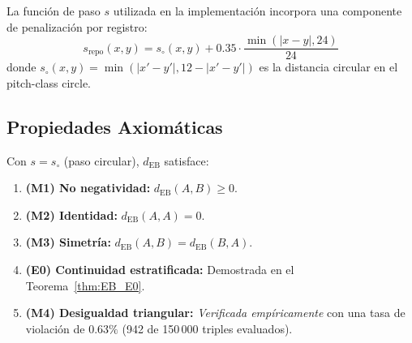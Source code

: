 La función de paso $s$ utilizada en la implementación incorpora una componente de penalización por registro:
\begin{equation}
s_{\text{repo}}(x, y) = s_{\circ}(x, y) + 0.35 \cdot \frac{\min(|x - y|, 24)}{24}
\end{equation}
donde $s_{\circ}(x,y) = \min(|x' - y'|, 12 - |x' - y'|)$ es la distancia circular en el pitch-class circle.

\subsection{Propiedades Axiomáticas}

\begin{proposition}[Axiomas de EB]
Con $s = s_{\circ}$ (paso circular), $d_{\text{EB}}$ satisface:
\begin{enumerate}
\item \textbf{(M1) No negatividad:} $d_{\text{EB}}(A, B) \geq 0$.
\item \textbf{(M2) Identidad:} $d_{\text{EB}}(A, A) = 0$.
\item \textbf{(M3) Simetría:} $d_{\text{EB}}(A, B) = d_{\text{EB}}(B, A)$.
\item \textbf{(E0) Continuidad estratificada:} Demostrada en el Teorema~\ref{thm:EB_E0}.
\item \textbf{(M4) Desigualdad triangular:} \textit{Verificada empíricamente} con una tasa de violación de $0.63\%$ (942 de 150\,000 triples evaluados).
\end{enumerate}
\end{proposition}

